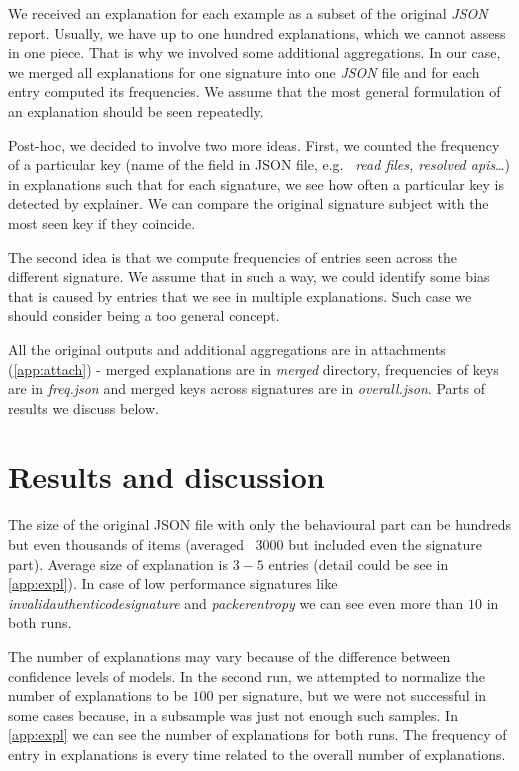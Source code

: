 We received an explanation for each example as a subset of the original \emph{JSON} report. Usually, we have up to one hundred explanations, which we cannot assess in one piece. That is why we involved some additional aggregations. In our case, we merged all explanations for one signature into one \emph{JSON} file and for each entry computed its frequencies. We assume that the most general formulation of an explanation should be seen repeatedly. 

Post-hoc, we decided to involve two more ideas. First, we counted the frequency of a particular key (name of the field in JSON file, e.g. \ \emph{read files, resolved apis}\dots) in explanations such that for each signature, we see how often a particular key is detected by explainer. We can compare the original signature subject with the most seen key if they coincide.

The second idea is that we compute frequencies of entries seen across the different signature. We assume that in such a way, we could identify some bias that is caused by entries that we see in multiple explanations. Such case we should consider being a too general concept. 

All the original outputs and additional aggregations are in attachments (\ref{app:attach}) - merged explanations are in \emph{merged} directory, frequencies of keys are in \emph{freq.json} and merged keys across signatures are in \emph{overall.json}. Parts of results we discuss below.


\section{Results and discussion}
The size of the original JSON file with only the behavioural part can be hundreds but even thousands of items (averaged \texttildelow~$3000$ but included even the signature part). Average size of explanation is $3-5$ entries (detail could be see in \ref{app:expl}). In case of low performance signatures like \emph{invalidauthenticodesignature} and \emph{packerentropy} we can see even more than $10$ in both runs.

The number of explanations may vary because of the difference between confidence levels of models. In the second run, we attempted to normalize the number of explanations to be $100$ per signature, but we were not successful in some cases because, in a subsample was just not enough such samples.  In \ref{app:expl} we can see the number of explanations for both runs. The frequency of entry in explanations is every time related to the overall number of explanations.

